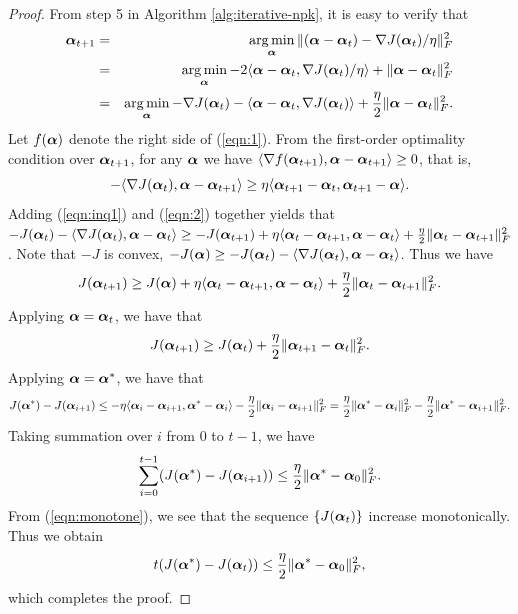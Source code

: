 \begin{proof}
From step 5 in Algorithm \ref{alg:iterative-npk}, it is easy to verify that
\begin{eqnarray}
\ba_{t+1} &=& \argmin_\ba \| (\ba - \ba_t) - \nabla\J(\ba_t) / \eta \|_F^2 \nonumber\\
&=& \argmin_\ba -2\langle \ba - \ba_t, \nabla\J(\ba_t)/\eta \rangle + \| \ba - \ba_t \|^2_F \nonumber\\
&=& \argmin_\ba -\nabla\J(\ba_t) - \langle \ba - \ba_t, \nabla\J(\ba_t) \rangle + \frac{\eta}{2}\| \ba - \ba_t \|^2_F \label{eqn:1} .
\end{eqnarray}
Let $f({\boldsymbol{\alpha}})$ denote the right side of (\ref{eqn:1}). From the first-order optimality condition over ${\boldsymbol{\alpha}}_{t+1}$, for any ${\boldsymbol{\alpha}}$ we have $\langle \nabla f({\boldsymbol{\alpha}}_{t+1}), {\boldsymbol{\alpha}} - {\boldsymbol{\alpha}}_{t+1} \rangle \geq 0$, that is,
\begin{equation}
-\langle \nabla\J(\ba_t), \ba - \ba_{t+1} \rangle \geq \eta\langle \ba_{t+1} - \ba_t, \ba_{t+1} - \ba \rangle \label{eqn:2} .
\end{equation}
Adding (\ref{eqn:inq1}) and (\ref{eqn:2}) together yields that $-J({\boldsymbol{\alpha}}_t) - \langle \nabla J({\boldsymbol{\alpha}}_t), {\boldsymbol{\alpha}} - {\boldsymbol{\alpha}}_t \rangle \geq -J({\boldsymbol{\alpha}}_{t+1}) + \eta \langle {\boldsymbol{\alpha}}_t - {\boldsymbol{\alpha}}_{t+1}, {\boldsymbol{\alpha}} - {\boldsymbol{\alpha}}_t \rangle + \frac{\eta}{2}\| {\boldsymbol{\alpha}}_t - {\boldsymbol{\alpha}}_{t+1} \|^2_F $. Note that $-J$ is convex, $-J({\boldsymbol{\alpha}}) \geq -J({\boldsymbol{\alpha}}_t) - \langle \nabla J({\boldsymbol{\alpha}}_t), {\boldsymbol{\alpha}} - {\boldsymbol{\alpha}}_t \rangle$. Thus we have
\begin{equation}
\J(\ba_{t+1}) \geq \J(\ba) + \eta\langle \ba_t - \ba_{t+1}, \ba - \ba_t \rangle + \frac{\eta}{2}\| \ba_t - \ba_{t+1} \|^2_F. \nonumber %
\end{equation}
Applying ${\boldsymbol{\alpha}} = {\boldsymbol{\alpha}}_t$, we have that
\begin{equation}
\J(\ba_{t+1}) \geq \J(\ba_t) + \frac{\eta}{2}\| \ba_{t+1} - \ba_t \|^2_F. \nonumber%
\end{equation}
Applying ${\boldsymbol{\alpha}} = {\boldsymbol{\alpha}}^*$, we have that
\begin{equation}
\J(\ba^*) - \J(\ba_{i + 1}) \leq -\eta \langle \ba_i - \ba_{i+1}, \ba^* - \ba_i \rangle - \frac{\eta}{2}\| \ba_i - \ba_{i+1} \|^2_F = \frac{\eta}{2} \| \ba^* - \ba_i \|^2_F - \frac{\eta}{2} \| \ba^* - \ba_{i+1} \|^2_F. \label{eqn:monotone}
\end{equation}
Taking summation over $i$ from $0$ to $t-1$, we have
\[
\sum_{i=0}^{t-1} (J({\boldsymbol{\alpha}}^*) - J({\boldsymbol{\alpha}}_{i+1})) \leq \frac{\eta}{2} \| {\boldsymbol{\alpha}}^* - {\boldsymbol{\alpha}}_0 \|^2_F.
\]
From (\ref{eqn:monotone}), we see that the sequence $\{J({\boldsymbol{\alpha}}_t)\}$ increase monotonically. Thus we obtain
\[
t(J({\boldsymbol{\alpha}}^*) - J({\boldsymbol{\alpha}}_t)) \leq \frac{\eta}{2} \| {\boldsymbol{\alpha}}^* - {\boldsymbol{\alpha}}_0 \|^2_F,
\]
which completes the proof.
\end{proof}

